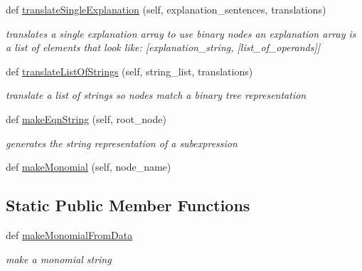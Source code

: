 \begin{DoxyCompactItemize}
def \hyperlink{classtotally__new__visualizer_1_1_equation_step_parser_aef7a56859ca1922b836ddd56370288bb}{translate\+Single\+Explanation} (self, explanation\+\_\+sentences, translations)
\begin{DoxyCompactList}\small\item\em translates a single explanation array to use binary nodes an explanation array is a list of elements that look like\+: \mbox{[}explanation\+\_\+string, \mbox{[}list\+\_\+of\+\_\+operands\mbox{]}\mbox{]} \end{DoxyCompactList}\item 
def \hyperlink{classtotally__new__visualizer_1_1_equation_step_parser_aee458203f9e3923538d93d619a09894c}{translate\+List\+Of\+Strings} (self, string\+\_\+list, translations)
\begin{DoxyCompactList}\small\item\em translate a list of strings so nodes match a binary tree representation \end{DoxyCompactList}\item 
def \hyperlink{classtotally__new__visualizer_1_1_equation_step_parser_a4d4b598b9a729895cdaadae73f407d83}{make\+Eqn\+String} (self, root\+\_\+node)
\begin{DoxyCompactList}\small\item\em generates the string representation of a subexpression \end{DoxyCompactList}\item 
def \hyperlink{classtotally__new__visualizer_1_1_equation_step_parser_a2eb2f89d46d274c80c7930a5f5fc9623}{make\+Monomial} (self, node\+\_\+name)
\end{DoxyCompactItemize}
\subsection*{Static Public Member Functions}
\begin{DoxyCompactItemize}
\item 
def \hyperlink{classtotally__new__visualizer_1_1_equation_step_parser_a8aaaf60180dffc7f531cd56df9bcc891}{make\+Monomial\+From\+Data}
\begin{DoxyCompactList}\small\item\em make a monomial string \end{DoxyCompactList}\end{DoxyCompactItemize}
